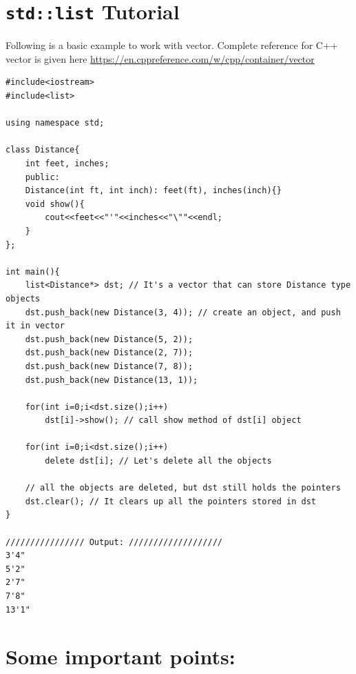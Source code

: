 \documentclass[a4paper,12pt]{article}
\begin{document}
\section{\texttt{std::list} Tutorial}

Following is a basic example to work with vector. Complete reference for C++ vector is given here \url{https://en.cppreference.com/w/cpp/container/vector}
\begin{lstlisting}
#include<iostream>
#include<list>

using namespace std;

class Distance{
	int feet, inches;
	public:
	Distance(int ft, int inch): feet(ft), inches(inch){}
	void show(){
		cout<<feet<<"'"<<inches<<"\""<<endl;
	}
};

int main(){
	list<Distance*> dst; // It's a vector that can store Distance type objects
	dst.push_back(new Distance(3, 4)); // create an object, and push it in vector
	dst.push_back(new Distance(5, 2));
	dst.push_back(new Distance(2, 7));
	dst.push_back(new Distance(7, 8));
	dst.push_back(new Distance(13, 1));
	
	for(int i=0;i<dst.size();i++)
		dst[i]->show(); // call show method of dst[i] object
		
	for(int i=0;i<dst.size();i++)
		delete dst[i]; // Let's delete all the objects
		
	// all the objects are deleted, but dst still holds the pointers	
	dst.clear(); // It clears up all the pointers stored in dst
}

//////////////// Output: ///////////////////
3'4"
5'2"
2'7"
7'8"
13'1"
	\end{lstlisting}

\section{Some important points:}
\end{document}
